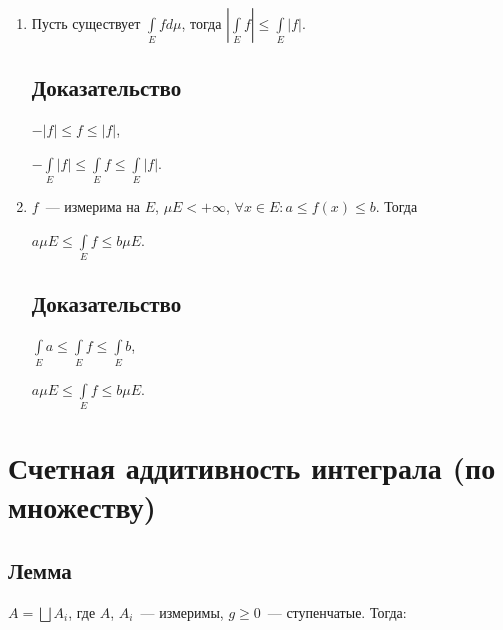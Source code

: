 \documentclass{article}
\begin{document}
\begin{enumerate}
\begin{itemize}
                    \end{itemize}
                    
            \item Пусть существует $\int\limits_{E} f d \mu$, тогда $\left| \int\limits_{E} f \right| \leqslant \int\limits_{E} |f|$.
            
                \subsection{Доказательство}
                
                    $- |f| \leqslant f \leqslant |f|$,
                    
                    $- \int\limits_{E} |f| \leqslant \int\limits_{E} f \leqslant \int\limits_{E} |f|$.
                    
            \item $f$~--- измерима на $E$, $\mu E < +\infty$, $\forall x \in E : a \leqslant f(x) \leqslant b$. Тогда 
            
                $a \mu E \leqslant \int\limits_{E} f \leqslant b \mu E$.
                
                \subsection{Доказательство}
                    
                    $\int\limits_{E} a \leqslant \int\limits_{E} f \leqslant \int\limits_{E} b$,
                    
                    $a \mu E \leqslant \int\limits_{E} f \leqslant b \mu E$.
                
        \end{enumerate}
        
    \newpage
    
    \section{Счетная аддитивность интеграла (по множеству)}
    
        \subsection{Лемма}
    
            $A = \bigsqcup A_i$, где $A$, $A_i$~--- измеримы, $g \geqslant 0$~--- ступенчатые. Тогда:
        
\end{document}
